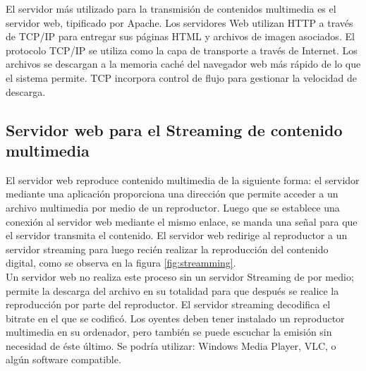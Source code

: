 El servidor más utilizado para la transmisión de contenidos multimedia es el servidor web, tipificado por Apache. Los servidores Web utilizan HTTP a través de TCP/IP para entregar sus páginas HTML y archivos de imagen asociados. El protocolo TCP/IP se utiliza como la capa de transporte a través de Internet. Los archivos se descargan a la memoria caché del navegador web más rápido de lo que el sistema permite. TCP incorpora control de flujo para gestionar la velocidad de descarga.\\
\subsection{Servidor web para el Streaming de contenido multimedia}

El servidor web reproduce contenido multimedia de la siguiente forma: el servidor mediante una aplicación proporciona una dirección que permite acceder a un archivo multimedia por medio de un reproductor. Luego que se establece una conexión al servidor web mediante el mismo enlace, se manda una señal para que el servidor transmita el contenido. El servidor web redirige al reproductor a un servidor streaming para luego recién realizar la reproducción del contenido digital, como se observa en la figura \ref{fig:streamming}.\\

Un servidor web no realiza este proceso sin un servidor Streaming de por medio; permite la descarga del archivo en su totalidad para que después se realice la reproducción por parte del reproductor. El servidor streaming decodifica el bitrate en el que se codificó. Los oyentes deben tener instalado un reproductor multimedia en su ordenador, pero también se puede escuchar la emisión sin necesidad de éste último. Se podría utilizar: Windows Media Player, VLC, o algún software compatible.\\

